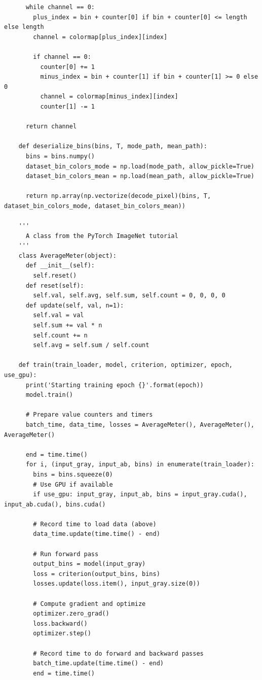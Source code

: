 \begin{longlisting}
\begin{verbatim}
      while channel == 0:
        plus_index = bin + counter[0] if bin + counter[0] <= length else length
        channel = colormap[plus_index][index]

        if channel == 0:
          counter[0] += 1
          minus_index = bin + counter[1] if bin + counter[1] >= 0 else 0
          channel = colormap[minus_index][index]
          counter[1] -= 1

      return channel

    def deserialize_bins(bins, T, mode_path, mean_path):
      bins = bins.numpy()
      dataset_bin_colors_mode = np.load(mode_path, allow_pickle=True)
      dataset_bin_colors_mean = np.load(mean_path, allow_pickle=True)

      return np.array(np.vectorize(decode_pixel)(bins, T, dataset_bin_colors_mode, dataset_bin_colors_mean))

    '''
      A class from the PyTorch ImageNet tutorial
    ''' 
    class AverageMeter(object):
      def __init__(self):
        self.reset()
      def reset(self):
        self.val, self.avg, self.sum, self.count = 0, 0, 0, 0
      def update(self, val, n=1):
        self.val = val
        self.sum += val * n
        self.count += n
        self.avg = self.sum / self.count

    def train(train_loader, model, criterion, optimizer, epoch, use_gpu):
      print('Starting training epoch {}'.format(epoch))
      model.train()

      # Prepare value counters and timers
      batch_time, data_time, losses = AverageMeter(), AverageMeter(), AverageMeter()

      end = time.time()
      for i, (input_gray, input_ab, bins) in enumerate(train_loader):
        bins = bins.squeeze(0)
        # Use GPU if available
        if use_gpu: input_gray, input_ab, bins = input_gray.cuda(), input_ab.cuda(), bins.cuda()

        # Record time to load data (above)
        data_time.update(time.time() - end)

        # Run forward pass
        output_bins = model(input_gray)
        loss = criterion(output_bins, bins)
        losses.update(loss.item(), input_gray.size(0))

        # Compute gradient and optimize
        optimizer.zero_grad()
        loss.backward()
        optimizer.step()

        # Record time to do forward and backward passes
        batch_time.update(time.time() - end)
        end = time.time()


\end{verbatim}
\end{longlisting}
